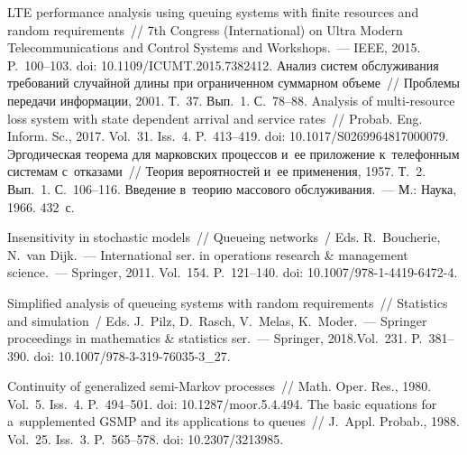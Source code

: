 \begin{multicols}{2}
{\small\frenchspacing
 {%
 \begin{thebibliography}{9}
LTE performance analysis using queuing systems with finite resources and random 
requirements~//  7th Congress (International) on Ultra Modern 
Telecommunications and Control Systems and Workshops.~--- IEEE, 
2015. P.~100--103. doi: 10.1109/ICUMT.2015.7382412.
 Анализ систем обслуживания 
требований случайной длины при ограниченном суммарном объеме~// 
Проблемы передачи информации, 2001. Т.~37. Вып.~1. С.~78--88.
 Analysis of multi-resource loss system with state 
dependent arrival and service rates~// Probab. Eng. Inform. 
Sc., 2017. Vol.~31. Iss.~4.  
P.~413--419. doi: 10.1017/S0269964817000079.
 Эргодическая теорема для марковских процессов 
и~ее приложение к~телефонным системам с~отказами~// Теория вероятностей 
и~ее применения, 1957. Т.~2. Вып.~1. С.~106--116.
 Введение в~теорию массового 
обслуживания.~--- М.: Наука, 1966. 432~с.

 Insensitivity in stochastic models~//  Queueing 
networks~/ Eds. R.~Boucherie, N.~van Dijk.~--- International ser. in 
operations research \& management science.~--- Springer, 2011.
Vol.~154. P.~121--140. doi:  
10.1007/978-1-4419-6472-4.

 Simplified analysis of 
queueing systems with random requirements~//   Statistics and simulation~/ 
Eds. J.~Pilz, D.~Rasch, V.~Melas, K.~Moder.~--- Springer proceedings in 
mathematics \& statistics ser.~--- Springer, 2018.Vol.~231. P.~381--390. doi:  
10.1007/978-3-319-76035-3\_27.

 Continuity of generalized semi-Markov processes~// Math. 
Oper. Res., 1980. Vol.~5. Iss.~4. P.~494--501. doi: 
10.1287/moor.5.4.494.
 The basic equations for a~supplemented GSMP 
and its applications to queues~// J.~\mbox{Appl}. Probab., 1988. Vol.~25. Iss.~3. 
P.~565--578. doi: 10.2307/3213985.
 \end{thebibliography}

 }
 }

\end{multicols}

